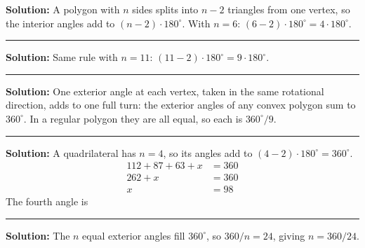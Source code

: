 \documentclass[12pt]{article}
\begin{document}




\textbf{Solution:} A polygon with $n$ sides splits into $n-2$ triangles from one vertex, so the interior angles add to $(n-2)\cdot 180^\circ$. With $n = 6$: $(6-2)\cdot 180^\circ = 4 \cdot 180^\circ$. 

\vspace{0.2cm}\noindent\rule{\linewidth}{0.2pt}


\textbf{Solution:} Same rule with $n = 11$: $(11-2)\cdot 180^\circ = 9 \cdot 180^\circ$. 

\vspace{0.2cm}\noindent\rule{\linewidth}{0.2pt}


\textbf{Solution:} One exterior angle at each vertex, taken in the same rotational direction, adds to one full turn: the exterior angles of any convex polygon sum to $360^\circ$. In a regular polygon they are all equal, so each is $360^\circ / 9$. 

\vspace{0.2cm}\noindent\rule{\linewidth}{0.2pt}


\textbf{Solution:} A quadrilateral has $n = 4$, so its angles add to $(4-2)\cdot 180^\circ = 360^\circ$.
\begin{align*}
  112 + 87 + 63 + x &= 360 \\
  262 + x &= 360 \\
  x &= 98
\end{align*}
The fourth angle is 

\vspace{0.2cm}\noindent\rule{\linewidth}{0.2pt}


\textbf{Solution:} The $n$ equal exterior angles fill $360^\circ$, so $360/n = 24$, giving $n = 360/24$. 
\end{document}
